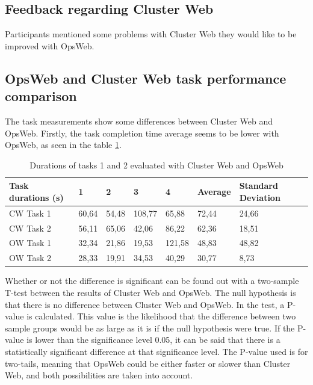 \subsection{Feedback regarding Cluster Web}
Participants mentioned some problems with Cluster Web they would like to be improved with OpsWeb.

\subsection{OpsWeb and Cluster Web task performance comparison} \label{cw_ow_task_perf}
The task measurements show some differences between Cluster Web and OpsWeb. Firstly, the task completion time average seems to be lower with OpsWeb, as seen in the table \ref{cw_ow_times}.

\begin{table}[!ht]
\def\arraystretch{1.1}%
    \begin{center}
    \caption{Durations of tasks 1 and 2 evaluated with Cluster Web and OpsWeb}
    \label{cw_ow_times}
    \begin{tabular}{| l | l | l | l | l | l | l | }
    \hline
    Task durations (s) & 1     & 2     & 3      & 4      & Average & Standard Deviation \\
    \hline
    CW Task 1            & 60,64 & 54,48 & 108,77 & 65,88  & 72,44   & 24,66              \\
    CW Task 2            & 56,11 & 65,06 & 42,06  & 86,22  & 62,36   & 18,51              \\
    OW Task 1            & 32,34 & 21,86 & 19,53  & 121,58 & 48,83   & 48,82              \\
    OW Task 2            & 28,33 & 19,91 & 34,53  & 40,29  & 30,77   & 8,73              \\
    \hline
    \end{tabular}
    \end{center}
\end{table}

Whether or not the difference is significant can be found out with a two-sample T-test between the results of Cluster Web and OpsWeb. The null hypothesis is that there is no difference between Cluster Web and OpsWeb. In the test, a P-value is calculated. This value is the likelihood that the difference between two sample groups would be as large as it is if the null hypothesis were true. If the P-value is lower than the significance level 0.05, it can be said that there is a statistically significant difference at that significance level. The P-value used is for two-tails, meaning that OpsWeb could be either faster or slower than Cluster Web, and both possibilities are taken into account.

